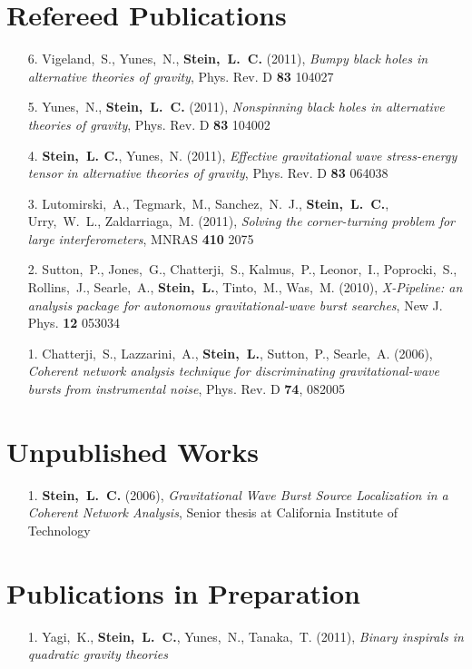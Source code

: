 \documentclass[margin,line]{res}
\begin{document}
\begin{resume}
\section{\sc Refereed Publications}
\begin{enumerate}
\item[{ 6.}] Vigeland,~S., Yunes,~N., {\bf Stein,~L.~C.} (2011), {\it
    Bumpy black holes in alternative theories of gravity},
  Phys. Rev. D {\bf 83} 104027
\item[{ 5.}] Yunes,~N., {\bf Stein,~L.~C.} (2011), {\it Nonspinning
    black holes in alternative theories of gravity},
  Phys. Rev. D {\bf 83} 104002
\item[{ 4.}] {\bf Stein,~L. C.}, Yunes,~N. (2011), {\it Effective
    gravitational wave stress-energy tensor in alternative theories of
    gravity}, Phys. Rev. D {\bf 83} 064038
\item[{ 3.}] Lutomirski,~A., Tegmark,~M., Sanchez,~N.~J., {\bf
    Stein,~L.~C.},
  Urry,~W.~L., Zaldarriaga,~M. (2011), {\it Solving the
    corner-turning problem for large interferometers}, MNRAS {\bf 410} 2075
\item[{ 2.}] Sutton,~P., Jones,~G., Chatterji,~S., Kalmus,~P., Leonor,~I.,
  Poprocki,~S., Rollins,~J., Searle,~A., {\bf Stein,~L.}, Tinto,~M.,
  Was,~M. (2010), {\it X-Pipeline: an analysis package for autonomous
    gravitational-wave burst searches}, New J. Phys. {\bf 12} 053034
\item[{ 1.}] Chatterji,~S., Lazzarini,~A., {\bf Stein,~L.}, Sutton,~P.,
  Searle,~A. (2006), {\it Coherent network analysis technique for
    discriminating gravitational-wave bursts from instrumental noise},
  Phys. Rev. D {\bf 74}, 082005
\end{enumerate}

\section{\sc Unpublished Works}
\begin{enumerate}
\item[{1.}] {\bf Stein,~L.~C.} (2006), {\it Gravitational Wave Burst Source Localization in a Coherent Network Analysis}, Senior thesis at California Institute of Technology
\end{enumerate}

\section{\sc Publications in Preparation}
\begin{enumerate}
\item[{1.}] Yagi,~K., {\bf Stein,~L.~C.}, Yunes,~N.,
  Tanaka,~T. (2011), {\it Binary inspirals in quadratic gravity theories}
\end{enumerate}


\end{resume}
\end{document}
